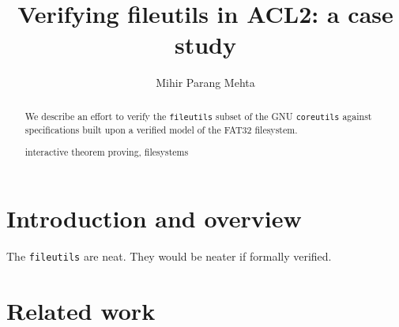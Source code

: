 \documentclass[runningheads,a4paper]{llncs}
\newcommand{\keywords}[1]{\par\addvspace\baselineskip
\noindent\keywordname\enspace\ignorespaces#1}
\begin{document}
\mainmatter  %

\title{Verifying fileutils in ACL2: a case study}


%
%
\author{Mihir Parang Mehta}
%


%
%

\maketitle

\begin{abstract}
  We describe an effort to verify the \texttt{fileutils} subset of the
  GNU \texttt{coreutils} against specifications built upon a verified
  model of the FAT32 filesystem.
\keywords{interactive theorem proving, filesystems}
\end{abstract}

\section{Introduction and overview}

The \texttt{fileutils} are neat. They would be neater if formally verified.

\section{Related work}
\end{document}
